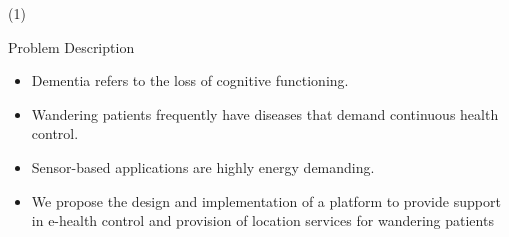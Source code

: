


\begin{frame}{ \footnotemark (1)}
\begin{block}{Problem Description } 
		\begin{itemize}
		\item Dementia refers to the loss of cognitive functioning.  
		\item Wandering patients frequently have diseases that demand continuous health control.
		\item Sensor-based applications are highly energy demanding.
        \item We propose the design and implementation of a platform to provide support in e-health control and provision of location services for wandering patients
		\end{itemize}
    
\end{block} 
\setcounter{footnote}{0}
\end{frame}


